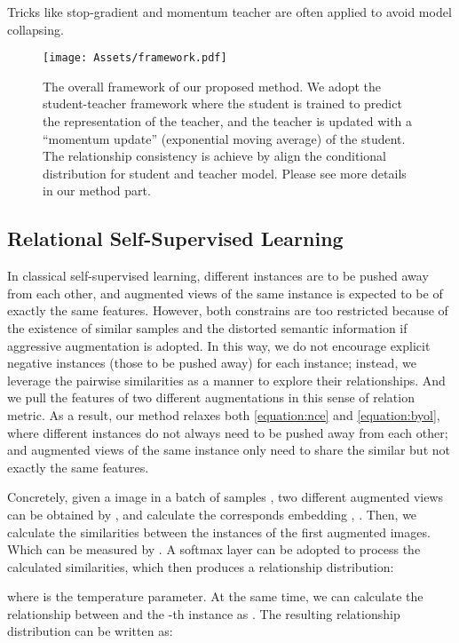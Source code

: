 \documentclass{article}
\newcommand{\<}{\left\langle}
\renewcommand{\>}{\right\rangle}
\begin{document}
Tricks like stop-gradient and momentum teacher are often applied to avoid model collapsing.

\begin{figure}
    \centering
    \texttt{[image: Assets/framework.pdf]}
    \vspace{-15pt}
    \caption{The overall framework of our proposed method. We adopt the student-teacher framework where the student is trained to predict the representation of the teacher, and the teacher is updated with a “momentum update” (exponential moving average) of the student. The relationship consistency is achieve by align the conditional distribution for student and teacher model. Please see more details in our method part.}
    \label{fig:framework}
    \vspace{-15pt}
\end{figure}

\vspace{-3pt}
\subsection{Relational Self-Supervised Learning}
In classical self-supervised learning, different instances are to be pushed away from each other, and augmented views of the same instance is expected to be of exactly the same features. However, both constrains are too restricted because of the existence of similar samples and the distorted semantic information if aggressive augmentation is adopted. In this way, we do not encourage explicit negative instances (those to be pushed away) for each instance; instead, we leverage the pairwise similarities as a manner to explore their relationships. And we pull the features of two different augmentations in this sense of relation metric. As a result, our method relaxes both \eqref{equation:nce} and \eqref{equation:byol}, where different instances do not always need to be pushed away from each other; and augmented views of the same instance only need to share the similar but not exactly the same features. 

Concretely, given a image  in a batch of samples , two different augmented views can be obtained by ,  and calculate the corresponds embedding  , . Then, we calculate the similarities between the instances of the first augmented images. Which can be measured by . A softmax layer can be adopted to process the calculated similarities, which then produces a relationship distribution:

where  is the temperature parameter. At the same time, we can calculate the relationship between  and the -th instance as . The resulting relationship distribution can be written as:
\end{document}
